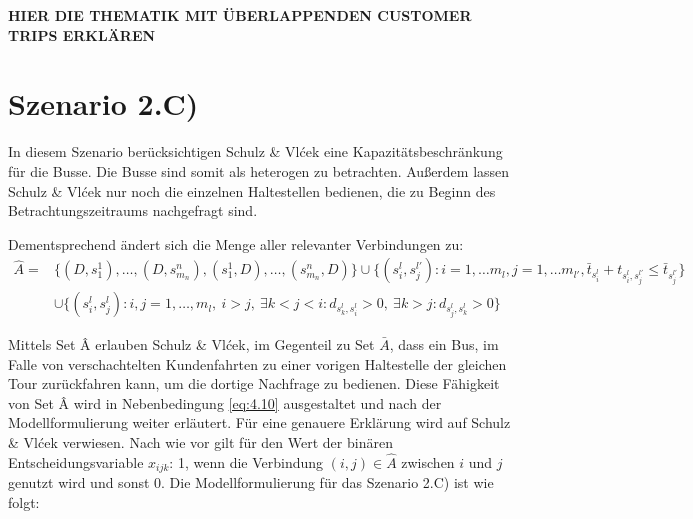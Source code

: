 \textbf{HIER DIE THEMATIK MIT ÜBERLAPPENDEN CUSTOMER TRIPS ERKLÄREN}

\section{Szenario 2.C)}
\label{sec:4.4}
\label{sec:Szenario 2.C)}
In diesem Szenario berücksichtigen Schulz \& Vlćek eine Kapazitätsbeschränkung für die Busse. Die Busse sind somit als heterogen zu betrachten. Außerdem lassen Schulz \& Vlćek nur noch die einzelnen Haltestellen bedienen, die zu Beginn des Betrachtungszeitraums nachgefragt sind.

Dementsprechend ändert sich die Menge aller relevanter Verbindungen zu:
\begin{align*}
    \hat{A} =
    & \big\{(D, s_1^1), \dots, (D, s_{m_n}^n), (s_1^1, D), \dots, (s_{m_n}^n, D)\big\} \cup \big\{(s_i^l, s_j^{l'}) :i = 1, \dots m_l,j = 1, \dots m_{l'}, \bar{t}_{s_i^l} + t_{s_i^l, s_j^{l'}} \leq \bar{t}_{s_j^{l'}} \big\} \\
    & \cup \big\{ (s_i^l, s_j^l) : i,j = 1,\dots, m_l,\ i > j,\ 
    \exists k < j < i : d_{s_k^l, s_i^l} > 0,\ 
    \exists k > j : d_{s_j^l, s_k^l} > 0 \big\}
\end{align*}
    
Mittels Set Â erlauben Schulz \& Vlćek, im Gegenteil zu Set $\bar{A}$, dass ein Bus, im Falle von verschachtelten Kundenfahrten zu einer vorigen Haltestelle der gleichen Tour \glqq zurückfahren\grqq{} kann, um die dortige Nachfrage zu bedienen. Diese Fähigkeit von Set Â wird in Nebenbedingung \ref{eq:4.10} ausgestaltet und nach der Modellformulierung weiter erläutert. Für eine genauere Erklärung wird auf Schulz \& Vlćek verwiesen. Nach wie vor gilt für den Wert der binären Entscheidungsvariable $x_{ijk}$: 1, wenn die Verbindung $(i,j) \in \hat{A}$ zwischen $i$ und $j$  genutzt wird und sonst 0. Die Modellformulierung für das Szenario 2.C) ist wie folgt:
 
